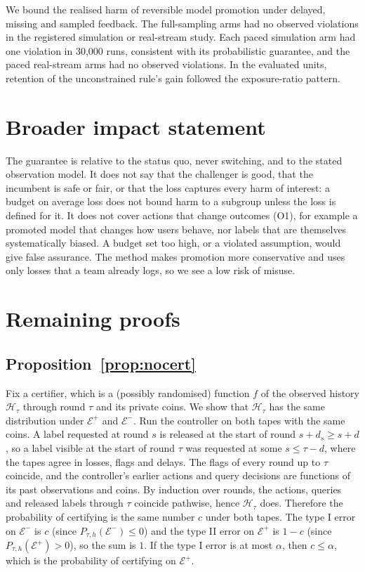 \documentclass[10pt]{article}
\theoremstyle{plain}
\theoremstyle{definition}
\begin{document}
We bound the realised harm of reversible model promotion under delayed, missing and sampled feedback. The full-sampling arms had no observed violations in the registered simulation or real-stream study. Each paced simulation arm had one violation in 30,000 runs, consistent with its probabilistic guarantee, and the paced real-stream arms had no observed violations. In the evaluated units, retention of the unconstrained rule's gain followed the exposure-ratio pattern.

\section*{Broader impact statement}
The guarantee is relative to the status quo, never switching, and to the stated observation model. It does not say that the challenger is good, that the incumbent is safe or fair, or that the loss captures every harm of interest: a budget on average loss does not bound harm to a subgroup unless the loss is defined for it. It does not cover actions that change outcomes (O1), for example a promoted model that changes how users behave, nor labels that are themselves systematically biased. A budget set too high, or a violated assumption, would give false assurance. The method makes promotion more conservative and uses only losses that a team already logs, so we see a low risk of misuse.




\appendix
\section{Remaining proofs}\label{app:proofs}
\subsection{Proposition~\ref{prop:nocert}}
Fix a certifier, which is a (possibly randomised) function $f$ of the observed history $\mathcal H_\tau$ through round $\tau$ and its private coins. We show that $\mathcal H_\tau$ has the same distribution under $\mathcal E^+$ and $\mathcal E^-$. Run the controller on both tapes with the same coins. A label requested at round $s$ is released at the start of round $s+d_s\ge s+d$, so a label visible at the start of round $\tau$ was requested at some $s\le\tau-d$, where the tapes agree in losses, flags and delays. The flags of every round up to $\tau$ coincide, and the controller's earlier actions and query decisions are functions of its past observations and coins. By induction over rounds, the actions, queries and released labels through $\tau$ coincide pathwise, hence $\mathcal H_\tau$ does. Therefore the probability of certifying is the same number $c$ under both tapes. The type I error on $\mathcal E^-$ is $c$ (since $P_{\tau,h}(\mathcal E^-)\le0$) and the type II error on $\mathcal E^+$ is $1-c$ (since $P_{\tau,h}(\mathcal E^+)>0$), so the sum is $1$. If the type I error is at most $\alpha$, then $c\le\alpha$, which is the probability of certifying on $\mathcal E^+$.
\end{document}
